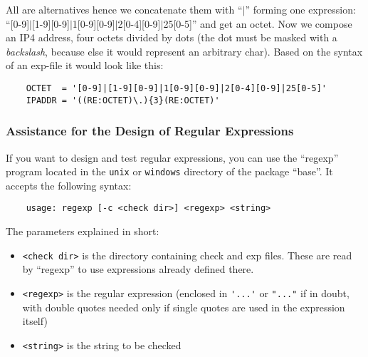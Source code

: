 All are alternatives hence we concatenate them with ``$|$'' forming
one expression: ``[0-9]$|$[1-9][0-9]$|$1[0-9][0-9]$|$2[0-4][0-9]$|$25[0-5]'' and
get an octet. Now we compose an IP4 address, four octets divided by dots (the dot
must be masked with a \emph{backslash}, because else it would represent an arbitrary
char). Based on the syntax of an exp-file it would look like this:

\begin{example}
\begin{verbatim}
    OCTET  = '[0-9]|[1-9][0-9]|1[0-9][0-9]|2[0-4][0-9]|25[0-5]'
    IPADDR = '((RE:OCTET)\.){3}(RE:OCTET)'
\end{verbatim}
\end{example}


\subsubsection{Assistance for the Design of Regular Expressions}

If you want to design and test regular expressions, you can use the
``regexp'' program located in the \texttt{unix} or \texttt{windows}
directory of the package ``base''. It accepts the following
syntax:

\begin{example}
\begin{verbatim}
    usage: regexp [-c <check dir>] <regexp> <string>
\end{verbatim}
\end{example}

The parameters explained in short:
\begin{itemize}
\item \texttt{<check dir>} is the directory containing check and exp files.
These are read by ``regexp'' to use expressions already defined there.

\item \texttt{<regexp>} is the regular expression (enclosed in \verb+'...'+
or \verb+"..."+ if in doubt, with double quotes needed only if single
quotes are used in the expression itself)


\item \texttt{<string>} is the string to be checked
\end{itemize}

